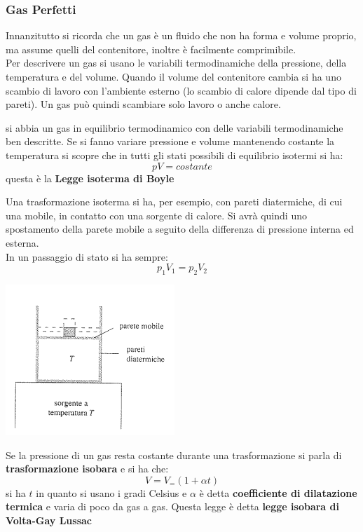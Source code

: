 \documentclass[a4paper,12pt, oneside]{book}
\begin{document}
\subsubsection{Gas Perfetti}
Innanzitutto si ricorda che un gas è un fluido che non ha forma e volume proprio, ma assume quelli del contenitore, inoltre è facilmente comprimibile. \\
Per descrivere un gas si usano le variabili termodinamiche della pressione, della temperatura e del volume. Quando il volume del contenitore cambia si ha uno scambio di lavoro con l'ambiente esterno (lo scambio di calore dipende dal tipo di pareti). Un gas può quindi scambiare solo lavoro o anche calore.\\
\begin{definizione}
si abbia un gas in equilibrio termodinamico con delle variabili termodinamiche ben descritte. Se si fanno variare pressione e volume mantenendo costante la temperatura si scopre che in tutti gli stati possibili di equilibrio isotermi si ha:
$$pV=costante$$
questa è la \textbf{Legge isoterma di Boyle}
\end{definizione}
Una trasformazione isoterma si ha, per esempio, con pareti diatermiche, di cui una mobile, in contatto con una sorgente di calore. Si avrà quindi uno spostamento della parete mobile a seguito della differenza di pressione interna ed esterna.\\
In un passaggio di stato si ha sempre:
$$p_1V_1=p_2V_2$$
\begin{center}
\includegraphics[scale=0.5]{img/term2.png}
\end{center}
Se la pressione di un gas resta costante durante una trasformazione si parla di \textbf{trasformazione isobara} e si ha che:
$$V=V_=(1+\alpha t)$$
si ha $t$ in quanto si usano i gradi Celsius e $\alpha$ è detta \textbf{coefficiente di dilatazione termica} e varia di poco da gas a gas. Questa legge è detta \textbf{legge isobara di Volta-Gay Lussac}\\
\end{document}
